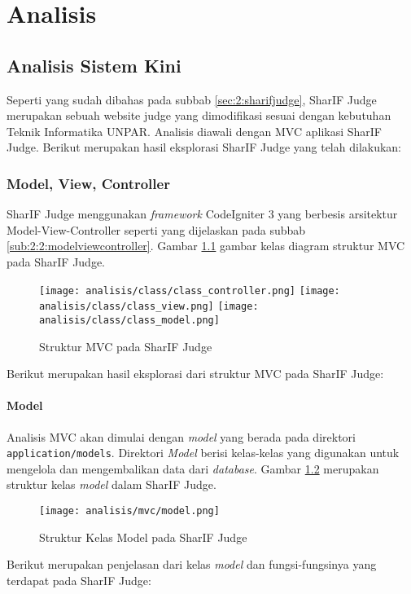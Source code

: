 \chapter{Analisis}
\label{chap:analisis}


\section{Analisis Sistem Kini}
\label{sec:3:sistemkini}

Seperti yang sudah dibahas pada subbab \ref{sec:2:sharifjudge}, SharIF Judge merupakan sebuah website judge yang dimodifikasi sesuai dengan kebutuhan Teknik Informatika UNPAR. Analisis diawali dengan MVC aplikasi SharIF Judge. Berikut merupakan hasil eksplorasi SharIF Judge yang telah dilakukan:

\subsection{Model, View, Controller}
\label{sub:3:1:modelviewcontroller}

SharIF Judge menggunakan \textit{framework} CodeIgniter 3 yang berbesis arsitektur Model-View-Controller seperti yang dijelaskan pada subbab \ref{sub:2:2:modelviewcontroller}. Gambar \ref{fig:3:1:mvc} gambar kelas diagram struktur MVC pada SharIF Judge.

\begin{figure}[H]
	\centering
	\texttt{[image: analisis/class/class\_controller.png]}
	\texttt{[image: analisis/class/class\_view.png]}
	\texttt{[image: analisis/class/class\_model.png]}
	\caption{Struktur MVC pada SharIF Judge}
	\label{fig:3:1:mvc}
\end{figure}

Berikut merupakan hasil eksplorasi dari struktur MVC pada SharIF Judge:

\subsubsection{Model}
\label{sub:3:1:1:model}

Analisis MVC akan dimulai dengan \textit{model} yang berada pada direktori \verb|application/models|. Direktori \textit{Model} berisi kelas-kelas yang digunakan untuk mengelola dan mengembalikan data dari \textit{database}.
Gambar \ref{fig:3:1:1:model} merupakan struktur kelas \textit{model} dalam SharIF Judge.
\begin{figure}[H]
	\centering
	\texttt{[image: analisis/mvc/model.png]}
	\caption{Struktur Kelas Model pada SharIF Judge}
	\label{fig:3:1:1:model}
\end{figure}
Berikut merupakan penjelasan dari kelas \textit{model} dan fungsi-fungsinya yang terdapat pada SharIF Judge:

